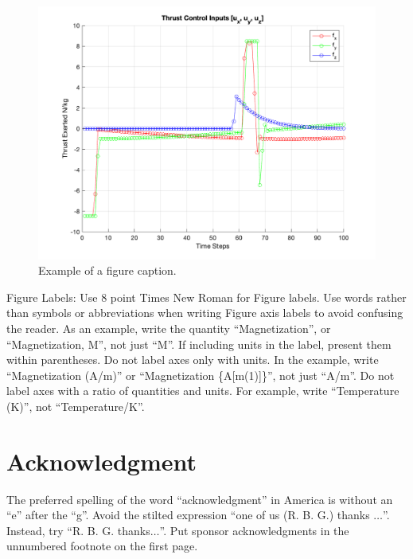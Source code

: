 \documentclass[conference, tikz]{IEEEtran}
\begin{document}
\begin{figure}[htbp]
\centerline{\includegraphics{Figures/Constrained_input_plot.png}}
\caption{Example of a figure caption.}
\label{fig}
\end{figure}

Figure Labels: Use 8 point Times New Roman for Figure labels. Use words 
rather than symbols or abbreviations when writing Figure axis labels to 
avoid confusing the reader. As an example, write the quantity 
``Magnetization'', or ``Magnetization, M'', not just ``M''. If including 
units in the label, present them within parentheses. Do not label axes only 
with units. In the example, write ``Magnetization (A/m)'' or ``Magnetization 
\{A[m(1)]\}'', not just ``A/m''. Do not label axes with a ratio of 
quantities and units. For example, write ``Temperature (K)'', not 
``Temperature/K''.

\section*{Acknowledgment}

The preferred spelling of the word ``acknowledgment'' in America is without 
an ``e'' after the ``g''. Avoid the stilted expression ``one of us (R. B. 
G.) thanks $\ldots$''. Instead, try ``R. B. G. thanks$\ldots$''. Put sponsor 
acknowledgments in the unnumbered footnote on the first page.





\vspace{12pt}
\end{document}
